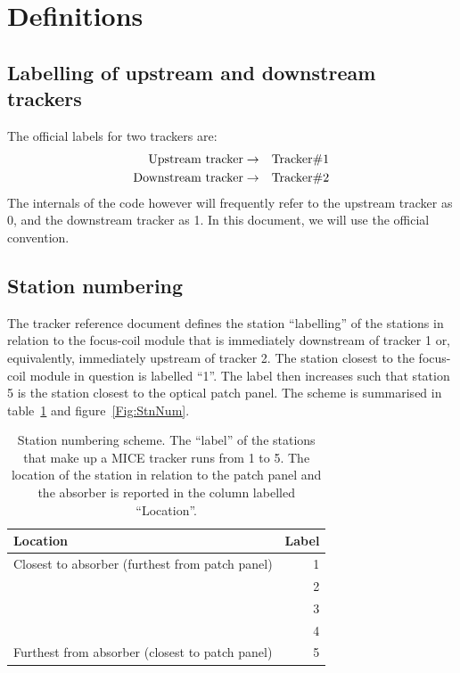 \section{Definitions}
\label{Sect:Definitions}

\subsection{Labelling of upstream and downstream trackers}
\label{SubSect:TkrLabel}

The official labels for two trackers are: 
\begin{eqnarray}
  {\rm Upstream~tracker}   & \rightarrow & {\rm Tracker \# 1} \nonumber \\
  {\rm Downstream~tracker} & \rightarrow & {\rm Tracker \# 2} \nonumber 
\end{eqnarray}
The internals of the code however will frequently refer to the upstream tracker as 0, and the downstream tracker as 1. In this document, we will use the official convention.

\subsection{Station numbering}
\label{SubSect:StnNumbering}

The tracker reference document defines the station ``labelling'' of the stations in relation to the focus-coil module that is immediately downstream of tracker 1 or, equivalently, immediately upstream of tracker 2.  The station closest to the focus-coil module in question is labelled  ``1''.  The label then increases such that station 5 is the station
closest to the optical patch panel. The scheme is summarised in table~\ref{Tab:StnNum} and figure~\ref{Fig:StnNum}.

\begin{table}[hb]
  \caption{Station numbering scheme. The ``label'' of the stations that make up a MICE tracker runs from 1 to 5. The location of the station in relation to the patch panel and the absorber is reported in the column labelled ``Location''.}
  \label{Tab:StnNum}
  \begin{tabular}{|l|r|}
    \hline
    {\bf Location}                                  & {\bf Label} \\
    \hline
    Closest to absorber (furthest from patch panel) &           1 \\
                                                    &           2 \\ 
                                                    &           3 \\
                                                    &           4 \\
    Furthest from absorber (closest to patch panel) &           5 \\
    \hline
  \end{tabular}
\end{table}

